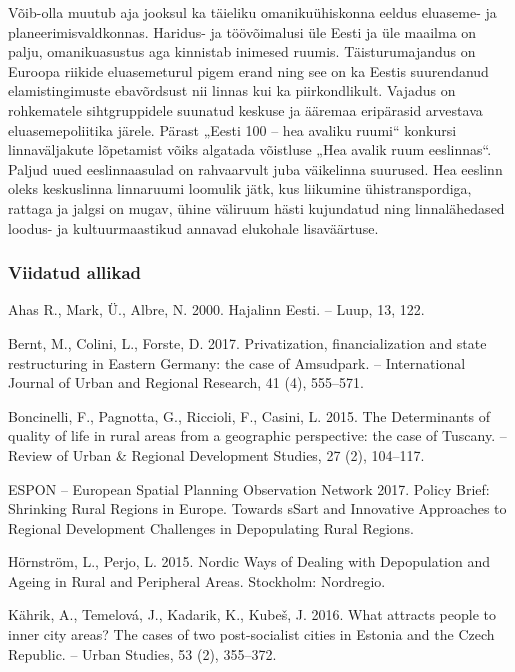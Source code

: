 \documentclass[estonian,]{article}
\begin{document}
Võib-olla muutub aja jooksul ka täieliku omanikuühiskonna eeldus eluaseme- ja planeerimisvaldkonnas. Haridus- ja töövõimalusi üle Eesti ja üle maailma on palju, omanikuasustus aga kinnistab inimesed ruumis. Täisturumajandus on Euroopa riikide eluasemeturul pigem erand ning see on ka Eestis suurendanud elamistingimuste ebavõrdsust nii linnas kui ka piirkondlikult. Vajadus on rohkematele sihtgruppidele suunatud keskuse ja ääremaa eripärasid arvestava eluasemepoliitika järele. Pärast „Eesti 100 -- hea avaliku ruumi`` konkursi linnaväljakute lõpetamist võiks algatada võistluse „Hea avalik ruum eeslinnas``. Paljud uued eeslinnaasulad on rahvaarvult juba väikelinna suurused. Hea eeslinn oleks keskuslinna linnaruumi loomulik jätk, kus liikumine ühistranspordiga, rattaga ja jalgsi on mugav, ühine väliruum hästi kujundatud ning linnalähedased loodus- ja kultuurmaastikud annavad elukohale lisaväärtuse.

\hypertarget{viidatud-allikad}{%
\subsubsection*{Viidatud allikad}\label{viidatud-allikad}}

Ahas R., Mark, Ü., Albre, N. 2000. Hajalinn Eesti. -- Luup, 13, 122.

Bernt, M., Colini, L., Forste, D. 2017. Privatization, financialization and state restructuring in Eastern Germany: the case of Amsudpark. -- International Journal of Urban and Regional Research, 41 (4), 555--571.

Boncinelli, F., Pagnotta, G., Riccioli, F., Casini, L. 2015. The Determinants of quality of life in rural areas from a geographic perspective: the case of Tuscany. -- Review of Urban \& Regional Development Studies, 27 (2), 104--117.

ESPON -- European Spatial Planning Observation Network 2017. Policy Brief: Shrinking Rural Regions in Europe. Towards sSart and Innovative Approaches to Regional Development Challenges in Depopulating Rural Regions.

Hörnström, L., Perjo, L. 2015. Nordic Ways of Dealing with Depopulation and Ageing in Rural and Peripheral Areas. Stockholm: Nordregio.

Kährik, A., Temelová, J., Kadarik, K., Kubeš, J. 2016. What attracts people to inner city areas? The cases of two post-socialist cities in Estonia and the Czech Republic. -- Urban Studies, 53 (2), 355--372.
\end{document}

